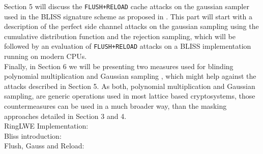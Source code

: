 Section 5 will discuss the \verb|FLUSH+RELOAD| cache attacks on the gaussian sampler used in the BLISS signature scheme as proposed in \cite{cryptoeprint:2016:300}. 
This part will start with a description of the perfect side channel attacks on the gaussian sampling using the cumulative distribution function and the rejection sampling, which will be followed by an evaluation of \verb|FLUSH+RELOAD| attacks on a BLISS implementation running on modern CPUs.\\
Finally, in Section 6 we will be presenting two measures used for blinding polynomial multiplication and Gaussian sampling \cite{cryptoeprint:2016:276}, which might help against the attacks described in Section 5. As both, polynomial multiplication and Gaussian sampling, are generic operations used in most lattice based cryptosystems, those countermeasures can be used in a much broader way, than the masking approaches detailed in Section 3 and 4.\\

RingLWE Implementation: \cite{Pöppelmann2014} \\
Bliss introduction: \cite{cryptoeprint:2013:383} \\
Flush, Gauss and Reload: \cite{cryptoeprint:2016:300} \\